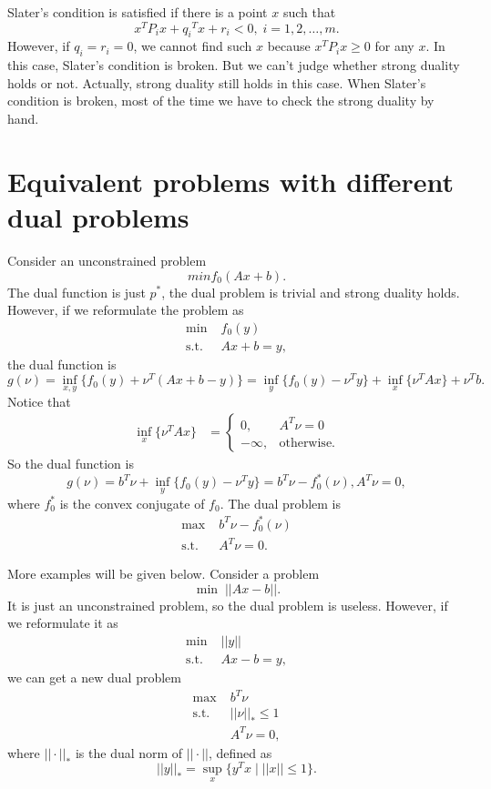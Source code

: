 \documentclass[lang=en,color=blue,mode=fancy,titlestyle=hang]{elegantbook}
\begin{document}
Slater's condition is satisfied if there is a point $x$ such that
\[
x^T P_i x + {q_i}^T x + r_i < 0, \; i = 1, 2, \ldots, m.
\]
However, if $q_i = r_i = 0$, we cannot find such $x$ because $x^T P_i x \geq 0$ for any $x$.
In this case, Slater's condition is broken. But we can't judge whether strong duality holds
or not. Actually, strong duality still holds in this case. When Slater's condition is broken,
most of the time we have to check the strong duality by hand.

\section{Equivalent problems with different dual problems}
Consider an unconstrained problem
\[
min f_0(Ax + b).
\]
The dual function is just $p^*$, the dual problem is trivial and strong duality holds. However, if we
reformulate the problem as
\begin{align*}
\min \; &f_0(y)\\
\text{s.t.} \; &Ax + b = y,
\end{align*}
the dual function is
\[
g(\nu) = \inf_{x, y} \{f_0(y) + \nu^T (Ax + b - y)\} = \inf_y \{f_0(y) - \nu^T y\} + \inf_x \{\nu^T A x\} + \nu^T b.
\]
Notice that
\begin{align*}
\inf_x \{\nu^T A x\} &= \begin{cases}
0, & A^T \nu = 0\\
- \infty, & \text{otherwise}.
\end{cases}
\end{align*}
So the dual function is
\[
g(\nu) = b^T \nu + \inf_y \{f_0(y) - \nu^T y\} = b^T \nu - f_0^*(\nu), A^T \nu = 0,
\]
where $f_0^*$ is the convex conjugate of $f_0$.
The dual problem is
\begin{align*}
\max \; &b^T \nu - f_0^*(\nu)\\
\text{s.t.} \; &A^T \nu = 0.
\end{align*}

More examples will be given below. Consider a problem
\[
\min \; ||Ax - b||.
\]
It is just an unconstrained problem, so the dual problem is useless. However, if we reformulate it as
\begin{align*}
\min \; &||y||\\
\text{s.t.} \; &Ax - b = y,
\end{align*}
we can get a new dual problem
\begin{align*}
\max \; &b^T \nu\\
\text{s.t.} \; &||\nu||_* \leq 1\\
& A^T \nu = 0,
\end{align*}
where $||\cdot||_*$ is the dual norm of $||\cdot||$, defined as
\[
||y||_* = \sup_{x} \{y^T x \;|\; ||x|| \leq 1\}.
\]
\end{document}
